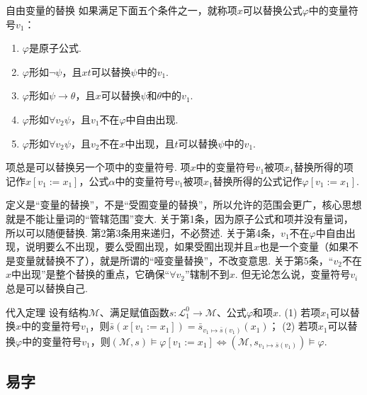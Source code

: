 \documentclass[main.tex]{subfiles}
\begin{document}
\begin{definition}{自由变量的替换}
    如果满足下面五个条件之一，就称项\(x\)可以替换公式\(\varphi\)中的变量符号\(v_1\)：
    \begin{enumerate}
        \item \(\varphi\)是原子公式.
        \item \(\varphi\)形如\(\neg \psi\)，且\(xt\)可以替换\(\psi\)中的\(v_1\).
        \item \(\varphi\)形如\(\psi \to \theta\)，且\(x\)可以替换\(\psi\)和\(\theta\)中的\(v_1\).
        \item \(\varphi\)形如\(\forall v_2 \psi\)，且\(v_1\)不在\(\varphi\)中自由出现.
        \item \(\varphi\)形如\(\forall v_2 \psi\)，且\(v_2\)不在\(x\)中出现，且\(t\)可以替换\(\psi\)中的\(v_1\).
    \end{enumerate}
    项总是可以替换另一个项中的变量符号. 项\(x\)中的变量符号\(v_1\)被项\(x_1\)替换所得的项记作\(x[v_1:=x_1]\)，公式\(\alpha\)中的变量符号\(v_1\)被项\(x_1\)替换所得的公式记作\(\varphi[v_1:=x_1]\).
\end{definition}

定义是“变量的替换”，不是“受囿变量的替换”，所以允许的范围会更广，核心思想就是不能让量词的“管辖范围”变大. 关于第1条，因为原子公式和项并没有量词，所以可以随便替换. 第2第3条用来递归，不必赘述. 关于第4条，\(v_1\)不在\(\varphi\)中自由出现，说明要么不出现，要么受囿出现，如果受囿出现并且\(x\)也是一个变量（如果不是变量就替换不了），就是所谓的“哑变量替换”，不改变意思. 关于第5条，“\(v_2\)不在\(x\)中出现”是整个替换的重点，它确保“\(\forall v_2\)”辖制不到\(x\). 但无论怎么说，变量符号\(v_i\)总是可以替换自己.


\begin{theorem}{代入定理}
    设有结构\(\mathcal{M}\)、满足赋值函数\(s:\mathcal{L}_1^0 \to \mathcal{M}\)、公式\(\varphi\)和项\(x\). \newline
    (1) 若项\(x_1\)可以替换\(x\)中的变量符号\(v_1\)，则\(\bar s(x[v_1:=x_1])=\bar s_{v_1 \mapsto \bar s(v_1)}(x_1)\)；\newline
    (2) 若项\(x_1\)可以替换\(\varphi\)中的变量符号\(v_1\)，则\((\mathcal{M}, s) \vDash \varphi[v_1:=x_1] \Longleftrightarrow (\mathcal{M}, s_{v_1 \mapsto \bar s(v_1)}) \vDash \varphi\).
\end{theorem}

\subsection{易字}
\end{document}
